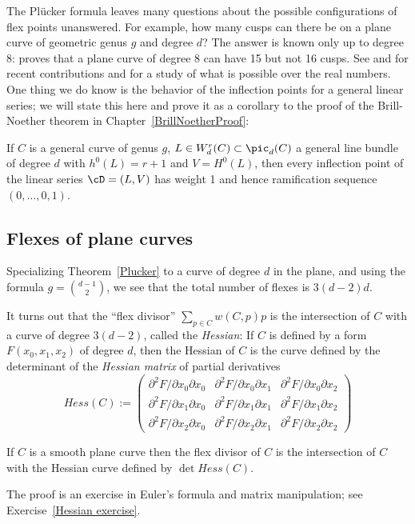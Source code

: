 The Pl\"ucker formula leaves many questions about the possible configurations of flex points unanswered. 
For example, how many cusps can there be on a plane curve of geometric genus $g$ and degree $d$? 
The answer is known only up to degree 8: \cite{Zariski1931} proves that a plane curve of degree 8 can have 15 but not 16 cusps.
See \cite{Calabri} and \cite{Kulikov} for recent contributions and \cite{Kharlamov-Sottile} for a study of what is possible
over the real numbers.
One thing we do know is the behavior of the inflection points for a general linear series; we will state this here and prove it as a corollary to the proof of the Brill-Noether theorem in Chapter~\ref{BrillNoetherProof}:

\begin{theorem}\label{Brill Noether Plucker}
If $C$ is a general curve of genus $g$, $L \in W^r_d(C) \subset \pic_d(C)$ a general line bundle of degree $d$ with $h^0(L) = r+1$ and $V = H^0(L)$, then every inflection point of the linear series $\cD = (L, V)$ has weight 1 and hence ramification sequence $(0, \dots, 0, 1)$.
\end{theorem}

\subsection{Flexes of plane curves}\label{plane curve pluecker}

Specializing Theorem~\ref{Plucker} to a curve of degree $d$ in the plane, and using the formula
$g= {d-1\choose 2}$, we see that the total number of flexes is $3(d-2)d$. 

It turns out that the ``flex divisor''
$\sum_{p\in C} w(C, p)p$
is the intersection of $C$ with a curve of degree $3(d-2)$, called the \emph{Hessian}: If $C$ is defined by a form $F(x_0, x_1, x_2)$ of degree $d$, then
the Hessian of $C$ is the curve defined by the determinant of the \emph{Hessian matrix} of partial derivatives
$$
Hess(C) :=
\begin{pmatrix}
 \partial^2 F/\partial x_0 \partial x_0 & \partial^2 F/\partial x_0 \partial x_1 & \partial^2 F/\partial x_0 \partial x_2 \\
\partial^2 F/\partial x_1 \partial x_0 & \partial^2 F/\partial x_1 \partial x_1 & \partial^2 F/\partial x_1 \partial x_2 \\
\partial^2 F/\partial x_2 \partial x_0 & \partial^2 F/\partial x_2 \partial x_1 & \partial^2 F/\partial x_2 \partial x_2 
\end{pmatrix}
$$
\begin{theorem}\label{Hessian} If $C$ is a smooth plane curve then the flex divisor of $C$ is the intersection 
of $C$ with the Hessian curve defined by $\det Hess(C)$.
\end{theorem}
The proof is an exercise in Euler's formula and matrix manipulation; see Exercise~\ref{Hessian exercise}.

